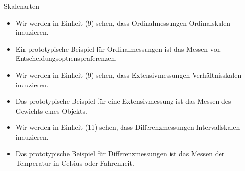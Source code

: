 \documentclass[
  8pt,
  ignorenonframetext,
]{beamer}
\providecommand{\tightlist}{%
  \setlength{\itemsep}{0pt}\setlength{\parskip}{0pt}}
\begin{document}
\begin{frame}{Skalenarten}
\protect\hypertarget{skalenarten-1}{}
\footnotesize
{}

\begin{itemize}
\tightlist
\item
  Wir werden in Einheit (9) sehen, dass Ordinalmessungen Ordinalskalen
  induzieren.
\item
  Ein prototypische Beispiel für Ordinalmessungen ist das Messen von
  Entscheidungsoptionspräferenzen.
\item
  Wir werden in Einheit (9) sehen, dass Extensivmessungen
  Verhältnisskalen induzieren.
\item
  Das prototypische Beispiel für eine Extensivmessung ist das Messen des
  Gewichts eines Objekts.
\item
  Wir werden in Einheit (11) sehen, dass Differenzmessungen
  Intervallskalen induzieren.
\item
  Das prototypische Beispiel für Differenzmessungen ist das Messen der
  Temperatur in Celsius oder Fahrenheit.
\end{itemize}
\end{frame}
\end{document}
